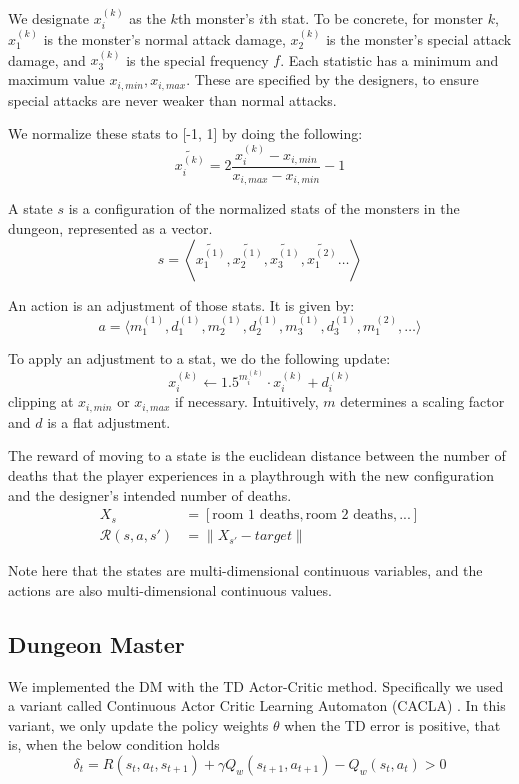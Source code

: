 \documentclass{article}
\begin{document}
We designate $x^{(k)}_{i}$ as the $k$th monster's $i$th stat. To be concrete, for monster $k$, $x^{(k)}_{1}$ is the monster's normal attack damage, $x^{(k)}_{2}$ is the monster's special attack damage, and $x^{(k)}_{3}$ is the special frequency $f$. Each statistic has a minimum and maximum value $x_{i, min}, x_{i, max}$. These are specified by the designers, to ensure special attacks are never weaker than normal attacks.

We normalize these stats to [-1, 1] by doing the following:
$$\widetilde{x^{(k)}_{i}} = 2 \frac{x^{(k)}_{i} - x_{i, min}}{x_{i, max} - x_{i, min}} - 1$$

A state $s$ is a configuration of the normalized stats of the monsters in the dungeon, represented as a vector.
$$s = \left\langle \widetilde{x^{(1)}_{1}}, \widetilde{x^{(1)}_{2}}, \widetilde{x^{(1)}_{3}}, \widetilde{x^{(2)}_{1}} \ldots \right\rangle$$

An action is an adjustment of those stats. It is given by:
$$a = \langle m^{(1)}_{1}, d^{(1)}_{1}, m^{(1)}_{2}, d^{(1)}_{2}, m^{(1)}_{3}, d^{(1)}_{3}, m^{(2)}_{1}, \ldots \rangle$$

To apply an adjustment to a stat, we do the following update:
$$x^{(k)}_{i} \leftarrow 1.5^{m^{(k)}_i} \cdot x^{(k)}_{i} + d^{(k)}_i$$
clipping at $x_{i, min}$ or $x_{i, max}$ if necessary. Intuitively, $m$ determines a scaling factor and $d$ is a flat adjustment.

The reward of moving to a state is the euclidean distance between the number of deaths that the player experiences in a playthrough with the new configuration and the designer's intended number of deaths.
\begin{align*}
X_s &= [\text{room 1 deaths}, \text{room 2 deaths}, ...] \\
\mathcal{R}(s, a, s') &= \lVert X_{s'} - target \rVert
\end{align*}


Note here that the states are multi-dimensional continuous variables, and the actions are also multi-dimensional continuous values.


\subsection{Dungeon Master}
We implemented the DM with the TD Actor-Critic method. Specifically we used a variant called Continuous Actor Critic Learning Automaton (CACLA) \cite{van2007reinforcement}. In this variant, we only update the policy weights $\theta$ when the TD error is positive, that is, when the below condition holds
$$\delta_t = R(s_t, a_t, s_{t+1}) + \gamma Q_w(s_{t+1}, a_{t+1}) - Q_w(s_t, a_t)  > 0$$
\end{document}
